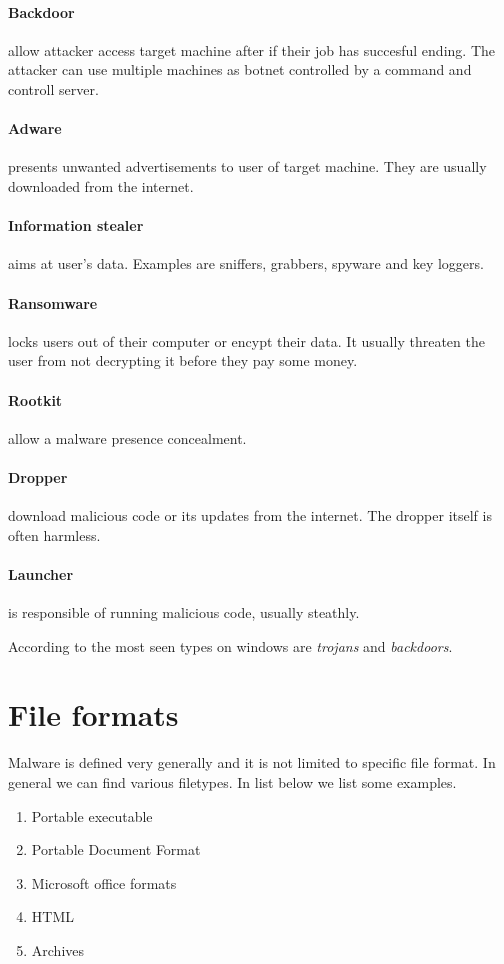 \paragraph{Backdoor} allow attacker access target machine after if their job has succesful ending. The attacker can use multiple machines as botnet controlled by a command and controll server.
\paragraph{Adware} presents unwanted advertisements to user of target machine. They are usually downloaded from the internet.
\paragraph{Information stealer} aims at user's data. Examples are sniffers, grabbers, spyware and key loggers.
\paragraph{Ransomware} locks users out of their computer or encypt their data. It usually threaten the user from not decrypting it before they pay some money.
\paragraph{Rootkit} allow a malware presence concealment.
\paragraph{Dropper} download malicious code or its updates from the internet. The dropper itself is often harmless.
\paragraph{Launcher} is responsible of running malicious code, usually steathly.

According to \cite{AVATLASM39:online} the most seen types on windows are \emph{trojans} and \emph{backdoors}.


\section{File formats}
Malware is defined very generally and it is not limited to specific file format. In general we can find various filetypes. In list below we list some examples.
\begin{enumerate}
  \item Portable executable
  \item Portable Document Format
  \item Microsoft office formats
  \item HTML
  \item Archives
\end{enumerate}

